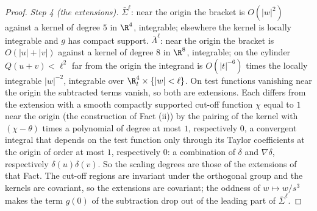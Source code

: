 \begin{proof}
\emph{Step 4 (the extensions).} $\bar\Sigma^{\ell}$: near the origin the bracket is $O(|w|^{2})$ against a kernel of degree $5$ in $\R^{4}$, integrable; elsewhere the kernel is locally integrable and $g$ has compact support. $\bar\Lambda^{\ell}$: near the origin the bracket is $O(|u| + |v|)$ against a kernel of degree $8$ in $\R^{8}$, integrable; on the cylinder $Q(u+v) < \ell^{2}$ far from the origin the integrand is $O(|t|^{-6})$ times the locally integrable $|w|^{-2}$, integrable over $\R^{4}_{t}\times\{|w| < \ell\}$. On test functions vanishing near the origin the subtracted terms vanish, so both are extensions. Each differs from the extension with a smooth compactly supported cut-off function $\chi$ equal to $1$ near the origin (the construction of Fact (ii)) by the pairing of the kernel with $(\chi - \theta)$ times a polynomial of degree at most $1$, respectively $0$, a convergent integral that depends on the test function only through its Taylor coefficients at the origin of order at most $1$, respectively $0$: a combination of $\delta$ and $\nabla\delta$, respectively $\delta(u)\delta(v)$. So the scaling degrees are those of the extensions of that Fact. The cut-off regions are invariant under the orthogonal group and the kernels are covariant, so the extensions are covariant; the oddness of $w \mapsto w/s^{3}$ makes the term $g(0)$ of the subtraction drop out of the leading part of $\bar\Sigma^{\ell}$.


\end{proof}
